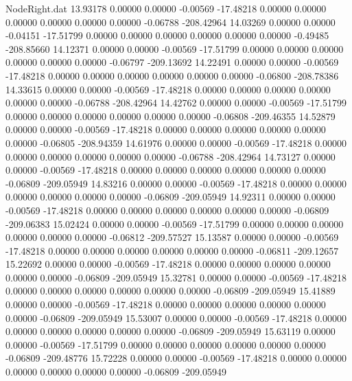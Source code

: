 \begin{filecontents}{NodeRight.dat}
  13.93178    0.00000    0.00000    -0.00569  -17.48218    0.00000    0.00000    0.00000    0.00000    0.00000    0.00000   -0.06788 -208.42964
  14.03269    0.00000    0.00000    -0.04151  -17.51799    0.00000    0.00000    0.00000    0.00000    0.00000    0.00000   -0.49485 -208.85660
  14.12371    0.00000    0.00000    -0.00569  -17.51799    0.00000    0.00000    0.00000    0.00000    0.00000    0.00000   -0.06797 -209.13692
  14.22491    0.00000    0.00000    -0.00569  -17.48218    0.00000    0.00000    0.00000    0.00000    0.00000    0.00000   -0.06800 -208.78386
  14.33615    0.00000    0.00000    -0.00569  -17.48218    0.00000    0.00000    0.00000    0.00000    0.00000    0.00000   -0.06788 -208.42964
  14.42762    0.00000    0.00000    -0.00569  -17.51799    0.00000    0.00000    0.00000    0.00000    0.00000    0.00000   -0.06808 -209.46355
  14.52879    0.00000    0.00000    -0.00569  -17.48218    0.00000    0.00000    0.00000    0.00000    0.00000    0.00000   -0.06805 -208.94359
  14.61976    0.00000    0.00000    -0.00569  -17.48218    0.00000    0.00000    0.00000    0.00000    0.00000    0.00000   -0.06788 -208.42964
  14.73127    0.00000    0.00000    -0.00569  -17.48218    0.00000    0.00000    0.00000    0.00000    0.00000    0.00000   -0.06809 -209.05949
  14.83216    0.00000    0.00000    -0.00569  -17.48218    0.00000    0.00000    0.00000    0.00000    0.00000    0.00000   -0.06809 -209.05949
  14.92311    0.00000    0.00000    -0.00569  -17.48218    0.00000    0.00000    0.00000    0.00000    0.00000    0.00000   -0.06809 -209.06383
  15.02424    0.00000    0.00000    -0.00569  -17.51799    0.00000    0.00000    0.00000    0.00000    0.00000    0.00000   -0.06812 -209.57527
  15.13587    0.00000    0.00000    -0.00569  -17.48218    0.00000    0.00000    0.00000    0.00000    0.00000    0.00000   -0.06811 -209.12657
  15.22692    0.00000    0.00000    -0.00569  -17.48218    0.00000    0.00000    0.00000    0.00000    0.00000    0.00000   -0.06809 -209.05949
  15.32781    0.00000    0.00000    -0.00569  -17.48218    0.00000    0.00000    0.00000    0.00000    0.00000    0.00000   -0.06809 -209.05949
  15.41889    0.00000    0.00000    -0.00569  -17.48218    0.00000    0.00000    0.00000    0.00000    0.00000    0.00000   -0.06809 -209.05949
  15.53007    0.00000    0.00000    -0.00569  -17.48218    0.00000    0.00000    0.00000    0.00000    0.00000    0.00000   -0.06809 -209.05949
  15.63119    0.00000    0.00000    -0.00569  -17.51799    0.00000    0.00000    0.00000    0.00000    0.00000    0.00000   -0.06809 -209.48776
  15.72228    0.00000    0.00000    -0.00569  -17.48218    0.00000    0.00000    0.00000    0.00000    0.00000    0.00000   -0.06809 -209.05949

\end{filecontents}
